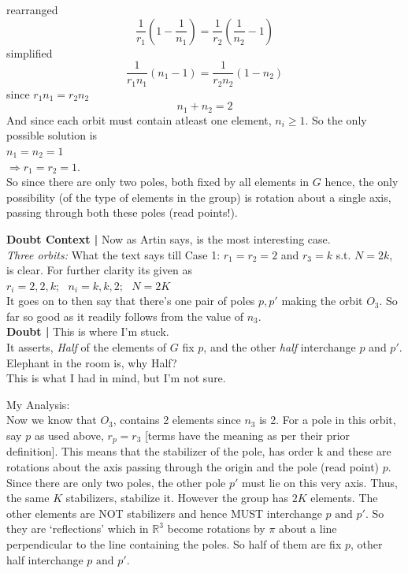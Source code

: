 rearranged
\begin{equation}
\frac{1}{r_{1}}(1 - \frac{1}{n_{1}}) = \frac{1}{r_{2}}(\frac{1}{n_{2}} - 1)
\end{equation}
simplified
\begin{equation}
\frac{1}{r_{1}n_{1}}(n_{1} - 1) = \frac{1}{r_{2}n_{2}}(1- n_{2})
\end{equation}
since ${r_{1}n_{1} = r_{2}n_{2}}$
\begin{equation}
n_{1} + n_{2} = 2
\end{equation}
And since each orbit must contain atleast one element, $n_{i} \geq 1$. So the only possible solution is\\
$n_{1}=n_{2}=1$\\
$\Rightarrow r_{1}=r_{2}=1$.\\
So since there are only two poles, both fixed by all elements in $G$ hence, the only possibility (of the type of elements in the group) is rotation about a single axis, passing through both these poles (read points!).
\par
{\bf Doubt Context | }
Now as Artin says, is the most interesting case.\\
\emph{Three orbits: } What the text says till Case 1: $r_{1}=r_{2}=2$ and $r_{3}=k$ s.t. $N=2k$, is clear. For further clarity its given as\\
$r_{i}=2,2,k; \,\,\,\, n_{i}=k,k,2; \,\,\,\, N=2K$\\
It goes on to then say that there's one pair of poles ${p,p'}$ making the orbit $O_{3}$. So far so good as it readily follows from the value of $n_{3}$.\\ {\bf Doubt |} This is where I'm stuck.\\
It asserts, \emph{Half} of the elements of $G$ fix $p$, and the other \emph{half} interchange $p$ and $p'$.\\
Elephant in the room is, why Half?\\
This is what I had in mind, but I'm not sure.
\par
My Analysis:\\
Now we know that $O_{3}$, contains 2 elements since $n_{3}$ is 2. For a pole in this orbit, say $p$ as used above, $r_{p}=r_{3}$ [terms have the meaning as per their prior definition]. This means that the stabilizer of the pole, has order k and these are rotations about the axis passing through the origin and the pole (read point) $p$. Since there are only two poles, the other pole $p'$ must lie on this very axis. Thus, the same $K$ stabilizers, stabilize it. However the group has $2K$ elements. The other elements are NOT stabilizers and hence MUST interchange $p \text{ and } p'$. So they are `reflections' which in $\mathbb R^{3}$ become rotations by $\pi$ about a line perpendicular to the line containing the poles. So half of them are fix $p$, other half interchange $p \text{ and } p'$.
